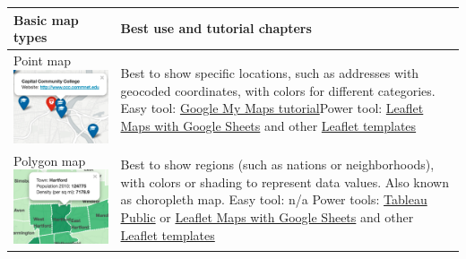 \documentclass[
  english,
]{book}
\begin{document}
\begin{longtable}[]{@{}ll@{}}
\toprule
\begin{minipage}[b]{0.47\columnwidth}\raggedright
Basic map types\strut
\end{minipage} & \begin{minipage}[b]{0.47\columnwidth}\raggedright
Best use and tutorial chapters\strut
\end{minipage}\tabularnewline
\midrule
\endhead
\begin{minipage}[t]{0.47\columnwidth}\raggedright
Point map \includegraphics{images/06-map/map-point.png}\strut
\end{minipage} & \begin{minipage}[t]{0.47\columnwidth}\raggedright
Best to show specific locations, such as addresses with geocoded coordinates, with colors for different categories. Easy tool: \href{mymaps}{Google My Maps tutorial}Power tool: \href{leaflet-maps-with-google-sheets}{Leaflet Maps with Google Sheets} and other \href{leaflet}{Leaflet templates}\strut
\end{minipage}\tabularnewline
\begin{minipage}[t]{0.47\columnwidth}\raggedright
Polygon map \includegraphics{images/06-map/map-polygon.png}\strut
\end{minipage} & \begin{minipage}[t]{0.47\columnwidth}\raggedright
Best to show regions (such as nations or neighborhoods), with colors or shading to represent data values. Also known as choropleth map. Easy tool: n/a Power tools: \href{tableau-polygon}{Tableau Public} or \href{leaflet-maps-with-google-sheets}{Leaflet Maps with Google Sheets} and other \href{leaflet}{Leaflet templates}\strut

\end{minipage}
\end{longtable}
\end{document}
